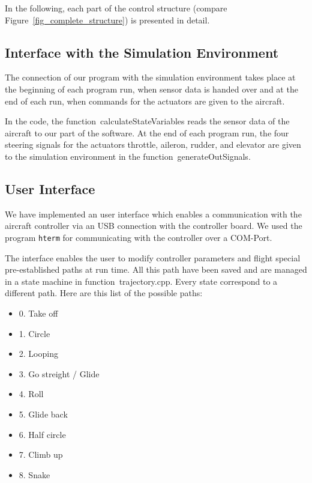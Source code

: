\documentclass[11pt,a4paper]{scrartcl}		%
\begin{document}
In the following, each part of the control structure (compare Figure~\ref{fig_complete_structure}) is presented in detail.

\medskip





\subsection{Interface with the Simulation Environment}

The connection of our program with the simulation environment takes place at the beginning of each program run, when sensor data is handed over and at the end of each run, when commands for the actuators are given to the aircraft.

In the code, the function~\textsf{calculateStateVariables} reads the sensor data of the aircraft to our part of the software.
At the end of each program run, the four steering signals for the actuators throttle, aileron, rudder, and elevator are given to the simulation environment in the function~\textsf{generateOutSignals}.

\medskip




\subsection{User Interface}

We have implemented an user interface which enables a communication with the aircraft controller via an USB connection with the controller board. 
We used the program \texttt{hterm} for communicating with the controller over a COM-Port.

The interface enables the user to modify controller parameters and flight special pre-established paths at run time. All this path have been saved and are managed in a state machine in function~\textsf{trajectory.cpp}. Every state correspond to a different path. Here are this list of the possible paths:

\begin{itemize}
\item 
0.	Take off
\item
1.	Circle
\item
2.	Looping
\item
3.	Go streight / Glide
\item
4.	Roll		
\item	
5.	Glide back
\item
6.	Half circle
\item
7.	Climb up
\item
8.	Snake
\end{itemize}
\end{document}
